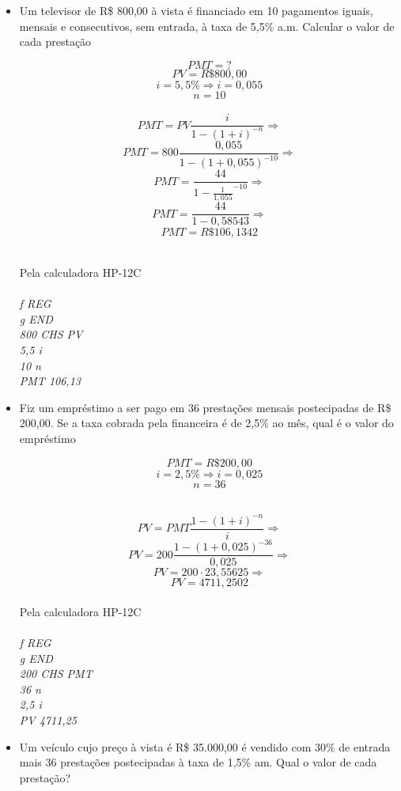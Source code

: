 \documentclass[a4paper, 12pt]{article}
\begin{document}
\begin{itemize}

\item Um televisor de R\$ 800,00 à vista é financiado em 10 pagamentos iguais, 
mensais e consecutivos, sem entrada, à taxa de 5,5\% a.m. Calcular o valor de 
cada prestação
  
$$ PMT = ? $$
$$ PV = R\$800,00 $$
$$ i = 5,5\% \Rightarrow i = 0,055 $$
$$ n = 10 $$
\\
$$ PMT = PV\frac{i}{1-(1+i)^{-n}} \Rightarrow $$
$$ PMT = 800\frac{0,055}{1-(1+0,055)^{-10}} \Rightarrow $$
$$ PMT = \frac{44}{1-\frac{1}{1,055}^{-10}} \Rightarrow $$
$$ PMT = \frac{44}{1-0,58543} \Rightarrow $$
$$ \boxed{PMT = R\$106,1342} $$

\\

Pela calculadora HP-12C\\\\
\emph{f REG}\\
\emph{g END}\\
\emph{800 CHS PV}\\
\emph{5,5 i}\\
\emph{10 n}\\
\emph{PMT 106,13}

\item Fiz um empréstimo a ser pago em 36 prestações mensais postecipadas de 
R\$ 200,00. Se a taxa cobrada pela financeira é de 2,5\% ao mês, qual é o valor 
do empréstimo
  
$$ PMT = R\$200,00 $$
$$ i = 2,5\% \Rightarrow i = 0,025 $$
$$ n = 36 $$

\\
$$ PV = PMT\frac{1-(1+i)^{-n}}{i} \Rightarrow $$
$$ PV = 200\frac{1-(1+0,025)^{-36}}{0,025} \Rightarrow $$
$$ PV = 200 \cdot 23,55625 \Rightarrow $$
$$ \boxed{PV = 4711,2502} $$
\\
Pela calculadora HP-12C\\\\
\emph{f REG}\\
\emph{g END}\\
\emph{200 CHS PMT}\\
\emph{36 n}\\
\emph{2,5 i}\\
\emph{PV 4711,25}  

\item Um veículo cujo preço à vista é R\$ 35.000,00 é vendido com 30\% de 
entrada mais 36 prestações postecipadas à taxa de 1,5\% am. Qual o valor de 
cada prestação?


\end{itemize}
\end{document}
